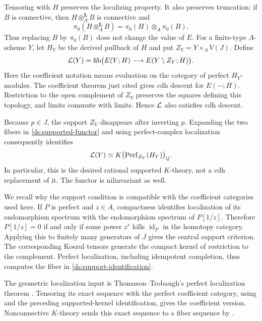 Tensoring with $H$ preserves the localizing property. It also
preserves truncation: if $B$ is connective, then
$H\otimes_A^{\mathbf L}B$ is connective and
\[
 \pi_0(H\otimes_A^{\mathbf L}B)
   =\pi_0(H)\otimes_A\pi_0(B).
\]
Thus replacing $B$ by $\pi_0(B)$ does not change the value of $E$.
For a finite-type $A$-scheme $Y$, let $H_Y$ be the derived pullback
of $H$ and put $Z_Y=Y\times_A V(J)$. Define
\begin{equation}
 \mathcal{L}(Y)=\operatorname{fib}\bigl(
    E(Y;H)\longrightarrow E(Y\setminus Z_Y;H)\bigr).
 \label{ds:supported-functor}
\end{equation}
Here the coefficient notation means evaluation on the category of
perfect $H_Y$-modules. The coefficient theorem just cited gives cdh
descent for $E(-;H)$. Restriction to the open complement of $Z_Y$
preserves the squares defining this topology, and limits commute
with limits. Hence $\mathcal{L}$ also satisfies cdh descent.

Because $p\in J$, the support $Z_Y$ disappears after inverting $p$.
Expanding the two fibers in \eqref{ds:supported-functor} and using
perfect-complex localization consequently identifies
\begin{equation}
 \mathcal{L}(Y)\simeq K\bigl(\operatorname{Perf}_{Z_Y}(H_Y)\bigr)_{\mathbb{Q}}.
 \label{ds:support-identification}
\end{equation}
In particular, this is the desired rational supported $K$-theory,
not a cdh replacement of it. The functor is nilinvariant as well.

We recall why the support condition is compatible with the
coefficient categories used here. If $P$ is perfect and $z\in A$,
compactness identifies localization of its endomorphism spectrum
with the endomorphism spectrum of $P[1/z]$. Therefore
$P[1/z]=0$ if and only if some power $z^v$ kills
$\operatorname{id}_P$ in the homotopy category. Applying this to
finitely many generators of $J$ gives the central support
criterion. The corresponding Koszul tensors generate the compact
kernel of restriction to the complement. Perfect localization,
including idempotent completion, thus computes the fiber in
\eqref{ds:support-identification}.

The geometric localization input is Thomason--Trobaugh's perfect
localization theorem \cite[Propositions~5.2.2--5.2.4 and
Theorem~7.4]{ThomasonTrobaugh}. Tensoring its exact sequence with the
perfect coefficient category, using \cite[Lemmas~3.12 and B.2]{LT}
and the preceding supported-kernel identification, gives the
coefficient version. Nonconnective $K$-theory sends this exact sequence
to a fiber sequence by \cite[Definition~8.1, Theorems~8.7 and 9.8,
and Section~9.3]{BGT}.

